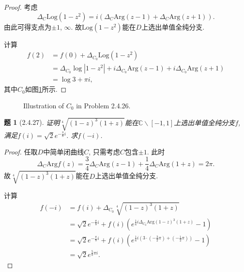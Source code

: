 \documentclass{article}[a4paper, 12pt]
\newtheorem{problem}{题}
\begin{document}
\begin{proof}
  考虑\[\Delta_C \mathrm{Log}(1-z^2)=i\left(\Delta_C\mathrm{Arg}(z-1)+\Delta_C\mathrm{Arg}(z+1)\right).\]
  由此可得支点为\(\pm 1\), \(\infty\). 故\(\mathrm{Log}(1-z^2)\)能在\(D\)上选出单值全纯分支.

  计算
  \begin{align*}
    f(2)&=f(0)+\Delta_{C_0} \mathrm{Log}(1-z^2)\\
    &=\Delta_{C_0}\log|1-z^2|+i\Delta_{C_0}\mathrm{Arg}(z-1)+i\Delta_{C_0}\mathrm{Arg}(z+1)\\
    &=\log 3+\pi i,
  \end{align*}
  其中\(C_0\)如图\ref{fig:1}所示.
\end{proof}

\begin{figure}[htbp]
  \centering
  \caption{Illustration of \(C_0\) in Problem 2.4.26.}
  \label{fig:1}
  \end{figure}

\begin{problem}[2.4.27]
  证明\(\sqrt[4]{(1-z)^3(1+z)}\)能在\(\mathbb{C}\backslash[-1,1]\)上选出单值全纯分支\(f\), 满足\(f(i)=\sqrt2e^{-\frac{\pi}{8}i}\). 求\(f(-i)\).
\end{problem}

\begin{proof}
  任取\(D\)中简单闭曲线\(C\), 只需考虑\(C\)包含\(\pm 1\). 此时\[\Delta_C\mathrm{Arg}f(z)=\frac{3}{4}\Delta_C\mathrm{Arg}(z-1)+\frac14\Delta_C\mathrm{Arg}(1+z)=2\pi.\]
  故\(\sqrt[4]{(1-z)^3(1+z)}\)能在\(D\)上选出单值全纯分支.

  计算
  \begin{align*}
    f(-i)&=f(i)+\Delta_{C_0}\sqrt[4]{(1-z)^3(1+z)}\\
    &=\sqrt2e^{-\frac{\pi}{8}i}+f(i)\left(e^{\frac14i\Delta_{C_0}\mathrm{Arg}(1-z)^3(1+z)}-1\right)\\
    &=\sqrt2e^{-\frac{\pi}{8}i}+f(i)\left(e^{\frac14i(3\cdot(-\frac{3}{2}\pi)+(-\frac{1}{2}\pi))}-1\right)\\
    &=\sqrt2e^{\frac{5}{8}\pi i}.
  \end{align*}
\end{proof}
\end{document}
